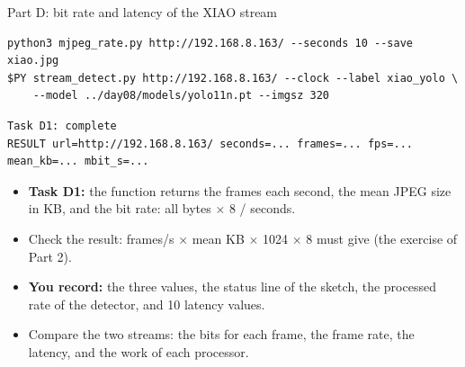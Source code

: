 \begin{frame}[fragile]{Part D: bit rate and latency of the XIAO stream}
\begin{lstlisting}[style=shell]
python3 mjpeg_rate.py http://192.168.8.163/ --seconds 10 --save xiao.jpg
$PY stream_detect.py http://192.168.8.163/ --clock --label xiao_yolo \
    --model ../day08/models/yolo11n.pt --imgsz 320
\end{lstlisting}
\begin{lstlisting}[style=shell, basicstyle=\ttfamily\tiny]
Task D1: complete
RESULT url=http://192.168.8.163/ seconds=... frames=... fps=... mean_kb=... mbit_s=...
\end{lstlisting}
  \small
  \begin{itemize}
    \item \textbf{Task D1:} the function  returns the
          frames each second, the mean JPEG size in KB, and the bit rate:
          all bytes $\times$ 8 / seconds.
    \item Check the result: frames/s $\times$ mean KB $\times$ 1024
          $\times$ 8 must give \code{mbit\_s} (the exercise of Part 2).
    \item \textbf{You record:} the three values, the status line of the
          sketch, the processed rate of the detector, and 10 latency
          values.
    \item Compare the two streams: the bits for each frame, the frame
          rate, the latency, and the work of each processor.
  \end{itemize}
\end{frame}
